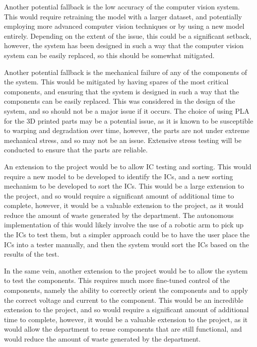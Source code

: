 Another potential fallback is the low accuracy of the computer vision system. This would require retraining the model with a larger dataset, and 
potentially employing more advanced computer vision techniques or by using a new model entirely. Depending on the extent of the issue, this could
be a significant setback, however, the system has been designed in such a way that the computer vision system can be easily replaced, so this should be somewhat mitigated.

Another potential fallback is the mechanical failure of any of the components of the system. This would be mitigated by having spares of the most critical components,
and ensuring that the system is designed in such a way that the components can be easily replaced. This was considered in the design of the system, and so
should not be a major issue if it occurs. The choice of using PLA for the 3D printed parts may be a potential issue, as it is known
to be susceptible to warping and degradation over time\cite{Ranakoti2022}, however, the parts are not under extreme mechanical stress, and so may not be an issue. Extensive
stress testing will be conducted to ensure that the parts are reliable.

An extension to the project would be to allow IC testing and sorting. This would require a new model to be developed to identify the ICs, and a new sorting mechanism to be developed to sort the ICs.
This would be a large extension to the project, and so would require a significant amount of additional time to complete, however, it would be a valuable extension to the project, as it would reduce the amount of waste generated by the department.
The autonomous implementation of this would likely involve the use of a robotic arm to pick up the ICs to test them, but a simpler approach could be to have the user place
the ICs into a tester manually, and then the system would sort the ICs based on the results of the test.

In the same vein, another extension to the project would be to allow the system to test the components. This requires much more fine-tuned control of the components, namely
the ability to correctly orient the components and to apply the correct voltage and current to the component.
This would be an incredible extension to the project, and so would require a significant amount of additional time to complete, however, it would be a valuable extension to the project, as it would allow the department to reuse components that are still functional, and would reduce the amount of waste generated by the department.